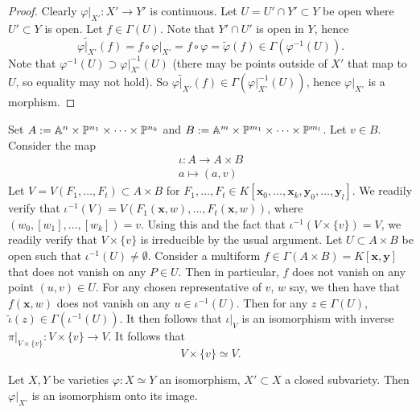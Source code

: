     \begin{proof}
        Clearly $\left. \varphi\right|_{X'} : X'\rightarrow Y'$ is continuous. Let $U=U'\cap Y'\subset Y$ be open where $U'\subset Y$ is open. Let $f\in \Gamma(U)$. Note that $Y'\cap U'$ is open in $Y$, hence 
        $$\widetilde{\left.\varphi\right|_{X'}}(f)=f\circ \left.\varphi\right|_{X'} = f\circ \varphi = \widetilde{\varphi}(f)\in \Gamma\left(\varphi^{-1}(U)\right).$$
        Note that $\varphi^{-1}(U)\supset \left.\varphi\right|_{X'}^{-1}(U)$ (there may be points outside of $X'$ that map to $U$, so equality may not hold). So $\widetilde{\left.\varphi\right|_{X'}}(f)\in \Gamma\left(\left.\varphi\right|_{X'}^{-1}(U)\right)$, hence $\left.\varphi\right|_{X'}$ is a morphism.
    \end{proof}
    \begin{example}
        Set $A:=\mathbb{A}^n\times \mathbb{P}^{n_1}\times \cdots \times \mathbb{P}^{n_k}$ and $B:= \mathbb{A}^m\times \mathbb{P}^{m_1}\times \cdots \times \mathbb{P}^{m_l}$. Let $v\in B$. Consider the map 
        \begin{gather*}
            \iota : A\rightarrow A\times B\\
            a\mapsto (a,v)
        \end{gather*}
        Let $V=V(F_1,\dots,F_t)\subset A\times B$ for $F_1,\dots,F_t\in K[\mathbf{x}_0,\dots,\mathbf{x}_k,\mathbf{y}_0,\dots,\mathbf{y}_l]$. We readily verify that $\iota^{-1}(V)=V(F_1(\mathbf{x},w),\dots,F_t(\mathbf{x},w))$, where $(w_0,[w_1],\dots,[w_k])=v$. Using this and the fact that $\iota^{-1}(V\times \{v\})=V$, we readily verify that $V\times \{v\}$ is irreducible by the usual argument. Let $U\subset A\times B$ be open such that $\iota^{-1}(U)\neq \emptyset$. Consider a multiform $f\in \Gamma(A\times B)= K[\mathbf{x},\mathbf{y}]$ that does not vanish on any $P\in U$. Then in particular, $f$ does not vanish on any point $(u,v)\in U$. For any chosen representative of $v$, $w$ say, we then have that $f(\mathbf{x},w)$ does not vanish on any $u\in \iota^{-1}(U)$. Then for any $z\in \Gamma(U)$, $\widetilde{\iota}(z)\in \Gamma\left(\iota^{-1}(U)\right)$.  
        It then follows that $\left.\iota\right|_{V}$ is an isomorphism with inverse $\left.\pi\right|_{V\times \{v\}}: V\times \{v\}  \rightarrow V$. It follows that 
        $$V\times \{v\} \simeq V.$$
    \end{example}
    \begin{lemma}\label{RestrictionOfIsomorphismToClosedSubvarietyIsIsomorphism}
        Let $X,Y$ be varieties $\varphi : X\simeq Y$ an isomorphism, $X'\subset X$ a closed subvariety. Then $\left.\varphi\right|_{X'}$ is an isomorphism onto its image. 
    \end{lemma}
